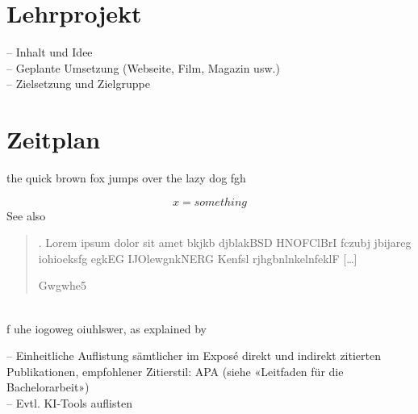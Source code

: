 \documentclass[12pt,a4paper]{article}        %
\begin{document}
\section{Lehrprojekt}
– Inhalt und Idee
\\– Geplante Umsetzung (Webseite, Film, Magazin usw.)
\\– Zielsetzung und Zielgruppe
\pagebreak
\section{Zeitplan}

the quick brown fox jumps over the lazy dog
fgh\smartcite[1-500, 28]{eg34} %

\[x=something\]
See also \cite{eg34}
\blockquote[Gwgwhe5]{. Lorem ipsum dolor sit amet  bkjkb djblakBSD HNOFClBrI fczubj jbijareg iohioeksfg egkEG IJOlewgnkNERG Kenfsl rjhgbnlnkelnfeklF […]} \parencite[22]{eg34}\\ %
f uhe iogoweg oiuhlswer, as explained by \textcite{eg34}

\pagebreak

\printbibliography[heading=bibintoc, title={Literaturverzeichnis}] %
– Einheitliche Auflistung sämtlicher im Exposé direkt und indirekt zitierten Publikationen, empfohlener Zitierstil: APA (siehe «Leitfaden für die Bachelorarbeit») \\
– Evtl. KI-Tools auflisten
\end{document}
